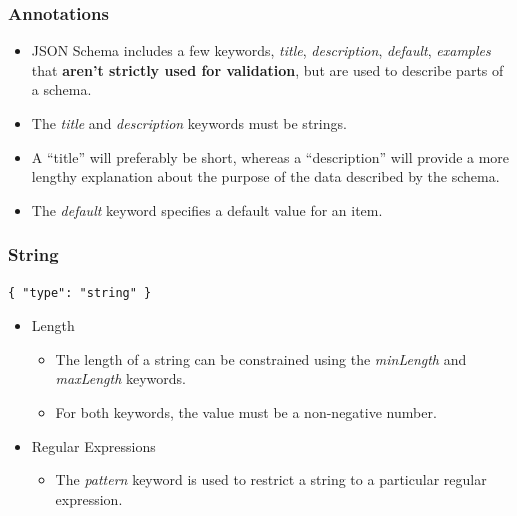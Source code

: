 \documentclass{efd-lecture}
\begin{document}
\begin{frame}
  \frametitle{Annotations}
  \begin{itemize}
    \item JSON Schema includes a few keywords,
      \textit{\color{YellowOrange}title},
      \textit{\color{YellowOrange}description},
      \textit{\color{YellowOrange}default},
      \textit{\color{YellowOrange}examples} that
      \textbf{\color{LimeGreen} aren’t strictly used for validation},
      but are used to describe parts of a schema.
    \item The \textit{\color{Yellow}title} and
      \textit{\color{Yellow}description} keywords must be strings.
    \item A ``title'' will preferably be short, whereas a ``description'' will provide
      a more lengthy explanation about the purpose of the data described by
      the schema.
    \item The \textit{\color{Cyan}default} keyword specifies a default
      value for an item.
  \end{itemize}
\end{frame}

\begin{frame}[fragile]
  \frametitle{String}
  \begin{verbatim}
{ "type": "string" }
  \end{verbatim}
  \begin{itemize}
    \item Length
    \begin{itemize}
      \item
        The length of a string can be constrained using the
        \textit{\color{LimeGreen}minLength} and
        \textit{\color{YellowOrange}maxLength} keywords.
      \item For both keywords, the value must be a non-negative number.
    \end{itemize}
    \item Regular Expressions
    \begin{itemize}
      \item The \textit{\color{YellowOrange}pattern} keyword is used to restrict
        a string to a particular regular expression.
    \end{itemize}
  \end{itemize}
\end{frame}
\end{document}
